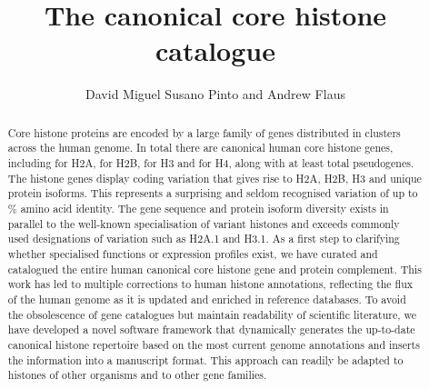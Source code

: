 \documentclass[10pt,a4paper,onecolumn,article,draft]{memoir}
\author{David Miguel Susano Pinto and Andrew Flaus}
\title{The canonical core histone catalogue}
\begin{document}

  \maketitle

  \begin{abstract}
	Core histone proteins are encoded by a large family of genes distributed
	in  clusters across the human genome.
	In total there are \TotalGenes{} canonical human core histone genes, including
	\HTwoACodingGenes{} for H2A, \HTwoBCodingGenes{} for H2B,
	\HThreeCodingGenes{} for H3 and \HFourCodingGenes{} for H4, 
	along with at least \TotalPseudoGenes{} total pseudogenes.
	The histone genes display coding variation that gives rise to
	\HTwoAUniqueProteins{} H2A, \HTwoBUniqueProteins{} H2B, 
	\HThreeUniqueProteins{} H3 and \HFourUniqueProteins{} unique protein isoforms.
	This represents a surprising and seldom recognised variation
	of up to \% amino acid identity. 
	The gene sequence and protein isoform diversity exists 
	in parallel to the well-known specialisation of variant histones 
	and exceeds commonly used designations of variation such as H2A.1 and H3.1. 
	As a first step to clarifying whether specialised functions or expression profiles exist, 
	we have curated and catalogued the entire human canonical core histone gene and protein complement.
	This work has led to multiple corrections to human histone annotations, 
	reflecting the flux of the human genome as it is updated and enriched in reference databases. 
	To avoid the obsolescence of gene catalogues but maintain readability of scientific literature, 
	we have developed a novel software framework that dynamically generates the up-to-date canonical histone repertoire 
	based on the most current genome annotations and inserts the information into a manuscript format. 
	This approach can readily be adapted to histones of other organisms and to other gene families.
  \end{abstract}
\end{document}
